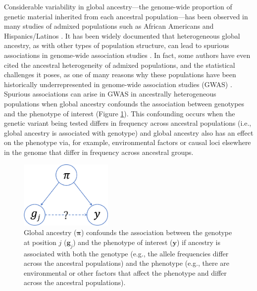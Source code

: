 \documentclass[12pt]{article}
\begin{document}
Considerable variability in global ancestry---the genome-wide proportion of genetic material inherited from each ancestral population---has been observed in many studies of admixed populations such as African Americans and Hispanics/Latinos \citep{parra1998, tishkoff2009, bryc2010aa, bryc2010hl, conomos2016}.
It has been widely documented that heterogeneous global ancestry, as with other types of population structure, can lead to spurious associations in genome-wide association studies \citep{GenomicControl, eigenstrat, marchini2004, price2010}. 
In fact, some authors have even cited the ancestral heterogeneity of admixed populations, and the statistical challenges it poses, as one of many reasons why these populations have been historically underrepresented in genome-wide association studies (GWAS) \citep{need2009, bustamante2011, popejoy2016, hindorff2018, manolio2019}.
Spurious associations can arise in GWAS in ancestrally heterogeneous populations when global ancestry confounds the association between genotypes and the phenotype of interest (Figure \ref{fig:confounding}). 
This confounding occurs when the genetic variant being tested differs in frequency across ancestral populations (i.e., global ancestry is associated with genotype) and global ancestry also has an effect on the phenotype via, for example, environmental factors or causal loci elsewhere in the genome that differ in frequency across ancestral groups.

\begin{figure}[h]
\center
\includegraphics[width=0.4\textwidth]{figs/confounding}
\caption{Global ancestry ($\boldsymbol\pi$) confounds the association between the genotype at position $j$ ($\mathbf{g}_j$) and the phenotype of interest ($\mathbf{y}$) if ancestry is associated with both the genotype (e.g., the allele frequencies differ across the ancestral populations) and the phenotype (e.g., there are environmental or other factors that affect the phenotype and differ across the ancestral populations).}
\label{fig:confounding}
\end{figure}
\end{document}
